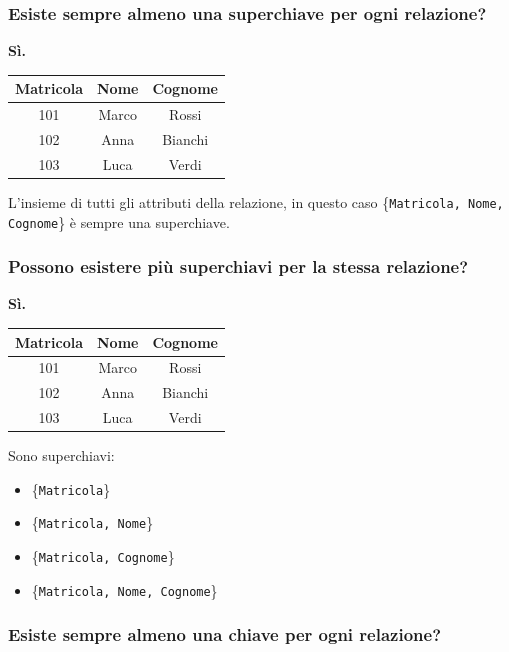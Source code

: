 \documentclass[a4paper,12pt]{article}
\begin{document}
\subsubsection*{Esiste sempre almeno una superchiave per ogni relazione?}

\textbf{Sì.}

\begin{center}
\begin{tabular}{|c|c|c|}
\hline
\textbf{Matricola} & \textbf{Nome} & \textbf{Cognome} \\
\hline
101 & Marco & Rossi \\
102 & Anna & Bianchi \\
103 & Luca & Verdi \\
\hline
\end{tabular}
\end{center}
L’insieme di tutti gli attributi della relazione, in questo caso \{\texttt{Matricola, Nome, Cognome}\} è sempre una superchiave.

\bigskip

\subsubsection*{Possono esistere più superchiavi per la stessa relazione?}

\textbf{Sì.}

\begin{center}
\begin{tabular}{|c|c|c|}
\hline
\textbf{Matricola} & \textbf{Nome} & \textbf{Cognome} \\
\hline
101 & Marco & Rossi \\
102 & Anna & Bianchi \\
103 & Luca & Verdi \\
\hline
\end{tabular}
\end{center}
Sono superchiavi:
\begin{itemize}
    \item \{\texttt{Matricola}\}
    \item \{\texttt{Matricola, Nome}\}
    \item \{\texttt{Matricola, Cognome}\}
    \item \{\texttt{Matricola, Nome, Cognome}\}
\end{itemize}

\bigskip

\subsubsection*{Esiste sempre almeno una chiave per ogni relazione?}
\end{document}
